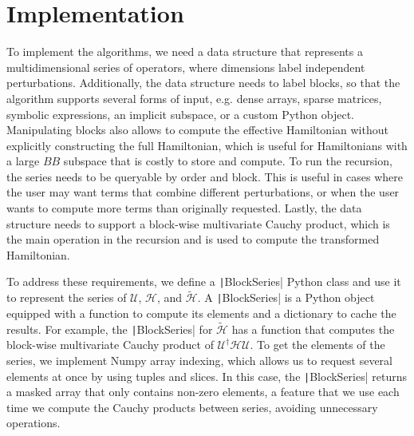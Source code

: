 \section{Implementation}

To implement the algorithms, we need a data structure that represents a
multidimensional series of operators, where dimensions label independent
perturbations.
Additionally, the data structure needs to label blocks, so that the algorithm
supports several forms of input, e.g. dense arrays, sparse matrices, symbolic
expressions, an implicit subspace, or a custom Python object.
Manipulating blocks also allows to compute the effective Hamiltonian without
explicitly constructing the full Hamiltonian, which is useful for Hamiltonians
with a large $BB$ subspace that is costly to store and compute.
To run the recursion, the series needs to be queryable by order and block.
This is useful in cases where the user may want terms that combine different
perturbations, or when the user wants to compute more terms than originally
requested.
Lastly, the data structure needs to support a block-wise multivariate Cauchy
product, which is the main operation in the recursion and is used to compute
the transformed Hamiltonian.

To address these requirements, we define a \texttt|BlockSeries| Python class and use
it to represent the series of $\mathcal{U}$, $\mathcal{H}$, and
$\tilde{\mathcal{H}}$.
A \texttt|BlockSeries| is a Python object equipped with a function to compute its
elements and a dictionary to cache the results.
For example, the \texttt|BlockSeries| for $\tilde{\mathcal{H}}$ has a function that
computes the block-wise multivariate Cauchy product of $\mathcal{U}^{\dagger}
\mathcal{H} \mathcal{U}$.
To get the elements of the series, we implement Numpy array indexing,
which allows us to request several elements at once by using tuples and slices.
In this case, the \texttt|BlockSeries| returns a masked array that only contains
non-zero elements, a feature that we use each time we compute the Cauchy
products between series, avoiding unnecessary operations.

